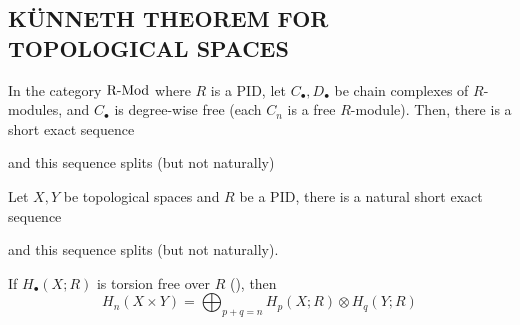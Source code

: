 \documentclass{article}
\begin{document}
\subsection{KÜNNETH THEOREM FOR TOPOLOGICAL SPACES}

\begin{theorem}
    In the category $\operatorname{R-Mod}$ where $R$ is a PID, let $C_\bullet, D_\bullet$ be chain complexes of $R$-modules, and $C_\bullet$ is degree-wise free (each $C_n$ is a free $R$-module). Then, there is a short exact sequence
    \begin{center}
    \end{center}
    and this sequence splits (but not naturally)
\end{theorem}

\begin{theorem}
    Let $X, Y$ be topological spaces and $R$ be a PID, there is a natural short exact sequence
    \begin{center}
    \end{center}
    and this sequence splits (but not naturally).
\end{theorem}

\begin{corollary}
    If $H_\bullet(X; R)$ is torsion free over $R$ (), then
    $$
        H_n(X \times Y) = \bigoplus_{p+q=n} H_p(X; R) \otimes H_q(Y; R)
    $$
\end{corollary}
\end{document}
